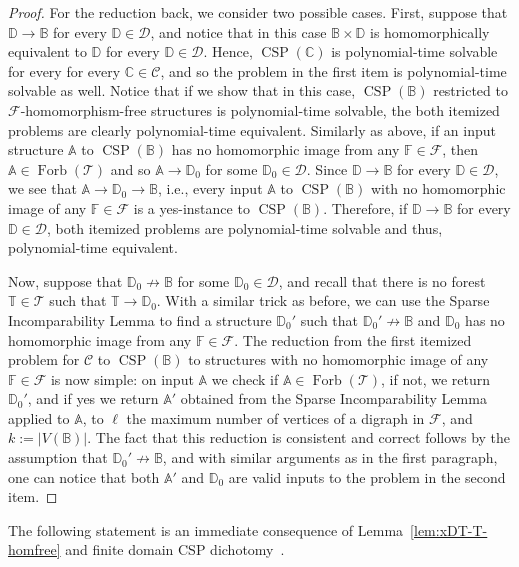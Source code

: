 \documentclass{article}
\theoremstyle{definition}
\theoremstyle{remark}
\DeclareMathOperator{\Forb}{Forb}
\DeclareMathOperator{\CSP}{CSP}
\newcommand{\bA}{{\mathbb A}}
\newcommand{\bB}{{\mathbb B}}
\newcommand{\bC}{{\mathbb C}}
\newcommand{\bD}{{\mathbb D}}
\newcommand{\bF}{{\mathbb F}}
\newcommand{\bT}{{\mathbb T}}
\newcommand{\calC}{{\mathcal C}}
\newcommand{\calD}{{\mathcal D}}
\newcommand{\calF}{{\mathcal F}}
\newcommand{\calT}{{\mathcal T}}
\begin{document}
\begin{proof}
    For the reduction back, we consider two possible cases. First, suppose that
    $\bD\to \bB$ for every $\bD\in \calD$, and notice that in this case
    $\bB\times \bD$ is homomorphically equivalent to $\bD$ for every $\bD\in \calD$.
    Hence, $\CSP(\bC)$ is polynomial-time solvable for every for every $\bC\in\calC$, 
    and so the problem in the first item is polynomial-time solvable as well. Notice that
    if we show that in this case, $\CSP(\bB)$ restricted to $\calF$-homomorphism-free structures
    is polynomial-time solvable, the both itemized problems are clearly
    polynomial-time equivalent. Similarly as above, if an input structure $\bA$ to $\CSP(\bB)$
    has no homomorphic image from any $\bF\in\calF$, then $\bA\in\Forb(\calT)$ and so $\bA\to \bD_0$
    for some $\bD_0\in \calD$.  Since $\bD\to \bB$ for every $\bD\in \calD$, we see that
    $\bA\to \bD_0\to \bB$, 
    i.e., every input $\bA$ to  $\CSP(\bB)$ with no homomorphic image of any $\bF\in\calF$
    is a yes-instance to $\CSP(\bB)$. Therefore, if $\bD\to \bB$ for every $\bD \in\calD$,
    both itemized problems are polynomial-time solvable and thus, polynomial-time equivalent. 

    Now, suppose that $\bD_0\not \to \bB$ for some $\bD_0\in \calD$, and recall that there is no
    forest $\bT\in\calT$ such that $\bT\to \bD_0$.  With a similar trick as before, we can
    use the Sparse Incomparability Lemma to find a structure $\bD_0'$ such that $\bD_0'\not\to \bB$
    and $\bD_0$ has no homomorphic image from any $\bF\in\calF$.  The reduction from the first
    itemized problem for $\calC$ to $\CSP(\bB)$ to structures with no homomorphic image of any
    $\bF\in\calF$ is now simple:
    on input $\bA$ we check if $\bA\in \Forb(\calT)$, if not, we return $\bD_0'$, 
    and if yes we return $\bA'$ obtained from the Sparse Incomparability Lemma applied to $\bA$, 
    to $\ell$ the maximum number of vertices of a digraph in $\calF$, and $k:=|V(\bB)|$.
    The fact that this reduction is consistent and correct follows by the assumption that
    $\bD_0'\not\to \bB$,  and with similar arguments as in the first paragraph, one can notice
    that both $\bA'$ and $\bD_0$ are valid inputs to the problem in the second item.
\end{proof}

The following statement is an immediate consequence of Lemma~\ref{lem:xDT-T-homfree}
and finite domain CSP dichotomy~\cite{BulatovFVConjecture,Zhuk20}.
\end{document}
